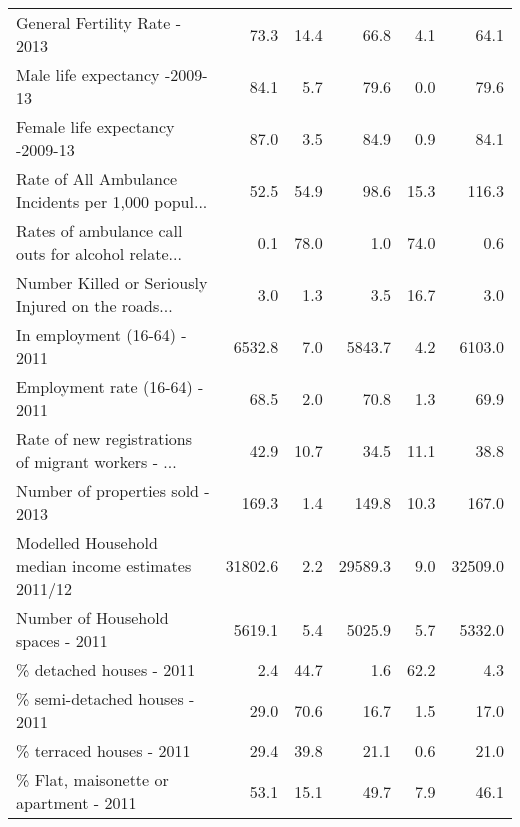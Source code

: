 \documentclass[conference]{IEEEtran}
\begin{document}
\begin{table*}[t]
\begin{tabular}{lrrrrr}
General Fertility Rate - 2013                      &           73.3 &       14.4 &           66.8 &        4.1 &    64.1 \\
Male life expectancy -2009-13                      &           84.1 &        5.7 &           79.6 &        0.0 &    79.6 \\
Female life expectancy -2009-13                    &           87.0 &        3.5 &           84.9 &        0.9 &    84.1 \\
Rate of All Ambulance Incidents per 1,000 popul... &           52.5 &       54.9 &           98.6 &       15.3 &   116.3 \\
Rates of ambulance call outs for alcohol relate... &            0.1 &       78.0 &            1.0 &       74.0 &     0.6 \\
Number Killed or Seriously Injured on the roads... &            3.0 &        1.3 &            3.5 &       16.7 &     3.0 \\
In employment (16-64) - 2011                       &         6532.8 &        7.0 &         5843.7 &        4.2 &  6103.0 \\
Employment rate (16-64) - 2011                     &           68.5 &        2.0 &           70.8 &        1.3 &    69.9 \\
Rate of new registrations of migrant workers - ... &           42.9 &       10.7 &           34.5 &       11.1 &    38.8 \\
Number of properties sold - 2013                   &          169.3 &        1.4 &          149.8 &       10.3 &   167.0 \\
Modelled Household median income estimates 2011/12 &        31802.6 &        2.2 &        29589.3 &        9.0 & 32509.0 \\
Number of Household spaces - 2011                  &         5619.1 &        5.4 &         5025.9 &        5.7 &  5332.0 \\
\% detached houses - 2011                           &            2.4 &       44.7 &            1.6 &       62.2 &     4.3 \\
\% semi-detached houses - 2011                      &           29.0 &       70.6 &           16.7 &        1.5 &    17.0 \\
\% terraced houses - 2011                           &           29.4 &       39.8 &           21.1 &        0.6 &    21.0 \\
\% Flat, maisonette or apartment - 2011             &           53.1 &       15.1 &           49.7 &        7.9 &    46.1 \\

\end{tabular}
\end{table*}
\end{document}
